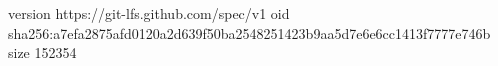 version https://git-lfs.github.com/spec/v1
oid sha256:a7efa2875afd0120a2d639f50ba2548251423b9aa5d7e6e6cc1413f7777e746b
size 152354
